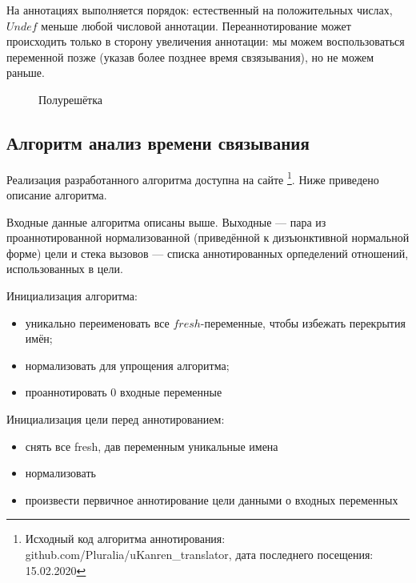 \documentclass[conference,american,russian]{IEEEtran}
\begin{document}
На аннотациях выполняется порядок: естественный на положительных числах, $Undef$ меньше любой числовой аннотации.
Переаннотирование может происходить только в сторону увеличения аннотации: мы можем воспользоваться переменной позже (указав более позднее время свзязывания), но не можем раньше.

\begin{figure}[htbp]
  \centering
  \caption{Полурешётка}
  \label{fig:image}
\end{figure}

\subsection{Алгоритм анализ времени связывания}

Реализация разработанного алгоритма доступна на сайте \github{}\footnote{Исходный код алгоритма аннотирования: github.com/Pluralia/uKanren\_translator, дата последнего посещения: 15.02.2020}. Ниже приведено описание алгоритма.

Входные данные алгоритма описаны выше.
Выходные --- пара из проаннотированной нормализованной (приведённой к дизъюнктивной нормальной форме) цели и стека вызовов --- списка аннотированных орпеделений отношений, использованных в цели.

Инициализация алгоритма:
\begin{itemize}
    \item уникально переименовать все $fresh$-переменные, чтобы избежать перекрытия имён;
    \item нормализовать для упрощения алгоритма;
    \item проаннотировать $0$ входные переменные
\end{itemize}

Инициализация цели перед аннотированием:
\begin{itemize}
    \item снять все fresh, дав переменным уникальные имена 
    \item нормализовать
    \item произвести первичное аннотирование цели данными о входных переменных
\end{itemize}
\end{document}
